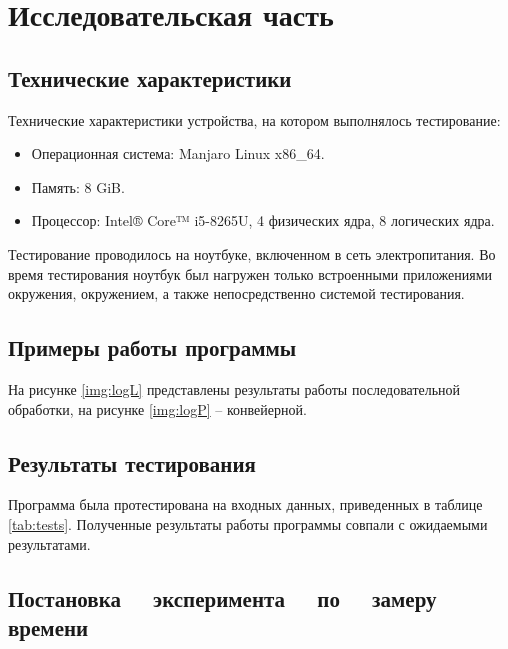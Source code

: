 \chapter{Исследовательская часть}

\section{Технические характеристики}

Технические характеристики устройства, на котором выполнялось тестирование:

\begin{itemize}
	\item Операционная система: Manjaro \cite{manjaro} Linux x86\_64.
	\item Память: 8 GiB.
    \item Процессор: Intel® Core™ i5-8265U, 4 физических ядра, 8 логических
        ядра\cite{intel}.
\end{itemize}

Тестирование проводилось на ноутбуке, включенном в сеть электропитания. Во
время тестирования ноутбук был нагружен только встроенными приложениями
окружения, окружением, а также непосредственно системой тестирования.

\section{Примеры работы программы}

На рисунке \ref{img:logL} представлены результаты работы последовательной
обработки, на рисунке \ref{img:logP} -- конвейерной.

%

\section{Результаты тестирования}

Программа была протестирована на входных данных, приведенных в таблице
\ref{tab:tests}. Полученные результаты работы программы совпали с ожидаемыми
результатами.

\section[Постановка эксперимента по замеру времени]
        {Постановка ~~эксперимента ~~по ~~замеру времени}


